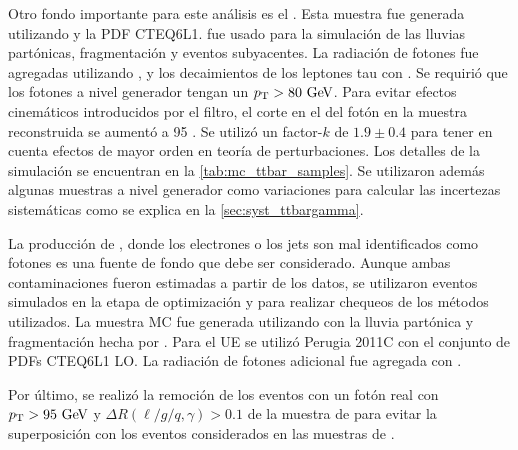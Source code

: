 Otro fondo importante para este análisis es el {\ttgam}. Esta muestra fue
generada utilizando {\madgraph}\cite{Alwall:2007st} y la PDF CTEQ6L1.
{\pythiasix}\cite{pythia} fue usado para la simulación de las lluvias
partónicas, fragmentación y eventos subyacentes. La radiación de fotones fue
agregadas utilizando {\photos}\cite{photos}, y los decaimientos de los leptones
tau con {\tauola}\cite{tauola}. Se requirió que los fotones a nivel generador
tengan un $\pt > 80 \gev$. Para evitar efectos cinemáticos introducidos por el
filtro, el corte en el {\pt} del fotón en la muestra reconstruida se aumentó a
95 {\gev}. Se utilizó un factor-$k$ de $1.9 \pm 0.4$\cite{Melnikov:2011ta, tth}
para tener en cuenta efectos de mayor orden en teoría de perturbaciones.
Los detalles de la simulación se encuentran en la \cref{tab:mc_ttbar_samples}.
Se utilizaron además algunas muestras a nivel generador como variaciones para calcular
las incertezas sistemáticas como se explica en la \cref{sec:syst_ttbargamma}.

La producción de {\ttbar}, donde los electrones o los jets son mal identificados
como fotones es una fuente de fondo que debe ser considerado. Aunque ambas
contaminaciones fueron estimadas a partir de los datos, se utilizaron eventos simulados
en la etapa de optimización y para realizar chequeos de los métodos utilizados.
La
muestra MC fue generada utilizando
{\powheg}\cite{Nason:2004rx,Frixione:2007vw,Alioli:2010xd} con la lluvia
partónica y fragmentación hecha por {\pythia}. Para el UE se utilizó Perugia
2011C con el
conjunto de PDFs CTEQ6L1 LO. La radiación de fotones adicional fue agregada con
{\photos}\cite{photos}.

Por último, se realizó la remoción
de los eventos con un fotón real con $\pt > 95 \gev$ y $\Delta R(\ell/g/q,\gamma) > 0.1$ de la muestra de {\ttbar} para evitar la superposición con los eventos
considerados en las muestras de {\ttgam}.


